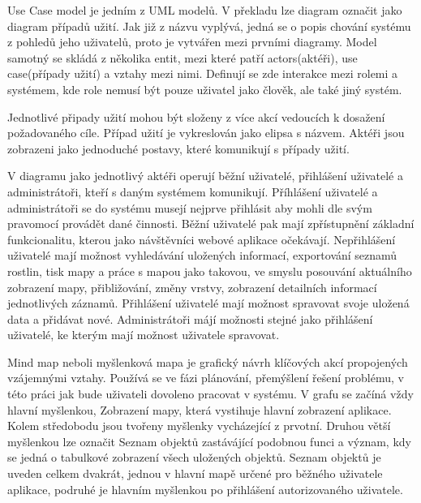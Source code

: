 \documentclass[12pt]{article}%
\begin{document}
{{
Use Case model je jedním z UML modelů. V překladu lze diagram označit jako diagram případů užití. 
Jak již z názvu vyplývá, jedná se o popis chování systému z pohledů jeho uživatelů, proto je 
vytvářen mezi prvními diagramy. Model samotný se skládá z několika entit, mezi které patří 
actors(aktéři),  use case(případy užití) a vztahy mezi nimi. Definují se zde interakce mezi rolemi 
a systémem, kde role nemusí být pouze uživatel jako člověk, ale také jiný systém.

Jednotlivé připady užití mohou být složeny z více akcí vedoucích k dosažení požadovaného cíle. 
Případ užití je vykreslován jako elipsa s názvem. Aktéři jsou zobrazeni jako jednoduché postavy, 
které komunikují s případy užití. 

V diagramu jako jednotlivý aktéři operují běžní uživatelé, přihlášení uživatelé a administrátoři, 
kteří s daným systémem komunikují. Příhlášení uživatelé a administrátoři se do systému musejí 
nejprve přihlásit aby mohli dle svým pravomocí provádět dané činnosti. Běžní uživatelé pak mají 
zpřístupnění základní funkcionalitu, kterou jako návštěvníci webové aplikace očekávají. Nepřihlášení 
uživatelé mají možnost vyhledávání uložených informací, exportování seznamů rostlin, tisk mapy 
a práce s mapou jako takovou, ve smyslu posouvání aktuálního zobrazení mapy, přibližování, změny 
vrstvy, zobrazení detailních informací jednotlivých záznamů. Přihlášení uživatelé mají možnost 
spravovat svoje uložená data a přidávat nové. Administrátoři májí možnosti stejné jako přihlášení 
uživatelé, ke kterým mají možnost uživatele spravovat. 
\obrazek
{}

\newpage
{}
Mind map neboli myšlenková mapa je grafický návrh klíčových akcí propojených vzájemnými vztahy. 
Používá se ve fázi plánování, přemýšlení řešení problému, v této práci jak bude uživateli dovoleno 
pracovat v systému. V grafu se začíná vždy hlavní myšlenkou, Zobrazení mapy, která vystihuje hlavní
zobrazení aplikace. Kolem středobodu jsou tvořeny myšlenky vycházející z prvotní. Druhou větší 
myšlenkou lze označit Seznam objektů zastávájící podobnou funci a význam, kdy se jedná o tabulkové 
zobrazení všech uložených objektů. Seznam objektů je uveden celkem dvakrát, jednou v hlavní mapě 
určené pro běžného uživatele aplikace, podruhé je hlavním myšlenkou po přihlášení autorizovaného 
uživatele.
\obrazek
{}

}}
\end{document}
